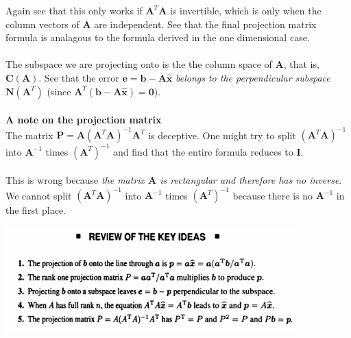 \documentclass{report}
\begin{document}
Again see that this only works if $\bm A^T\bm A$ is invertible, which is only when the column vectors of $\bm A$ are independent. See that the final projection 
matrix formula is analagous to the formula derived in the one dimensional case.\\
\vspace{1mm}\\
The subspace we are projecting onto is the the column space of $\bm A$, that is, $\bm C(\bm A)$. See that the error $\bm e=\bm b-\bm A\hat{\bm x}$ \textit{belongs to the 
perpendicular subspace} $\bm N(\bm A^T)$ (since $\bm A^T(\bm b-\bm A\hat{\bm x})=\bm 0$).\\
\vspace{1mm}\\
\textbf{A note on the projection matrix}\\
The matrix $\bm P=\bm A(\bm A^T\bm A)^{-1}\bm A^T$ is deceptive. One might try to split $(\bm A^T\bm A)^{-1}$ into $\bm A^{-1}$ times $(\bm A^T)^{-1}$ and find that the
entire formula reduces to $\bm I$.\\
\vspace{1mm}\\
This is wrong because \textit{the matrix $\bm A$ is rectangular and therefore has no inverse}. We cannot split $(\bm A^T\bm A)^{-1}$ into $\bm A^{-1}$ times $(\bm A^T)^{-1}$
because there is no $\bm A^{-1}$ in the first place.
\begin{center}
\includegraphics[width=11.2cm]{62}
\end{center}
\newpage
\end{document}
